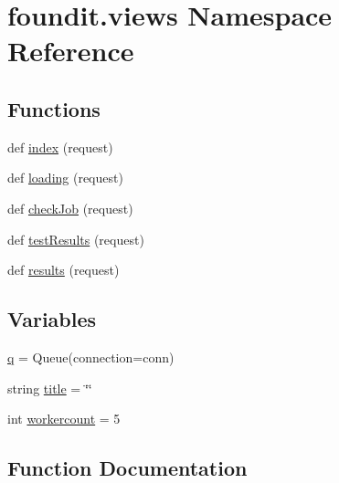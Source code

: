 \hypertarget{namespacefoundit_1_1views}{}\section{foundit.\+views Namespace Reference}
\label{namespacefoundit_1_1views}
\subsection*{Functions}
\begin{DoxyCompactItemize}
\item 
def \hyperlink{namespacefoundit_1_1views_a7dd28e8760cb6ba397d734043c840841}{index} (request)
\item 
def \hyperlink{namespacefoundit_1_1views_a1cea187af3aaa9ac41218cd985a3f24b}{loading} (request)
\item 
def \hyperlink{namespacefoundit_1_1views_a91bc63c48fad0582cbcff41458970486}{check\+Job} (request)
\item 
def \hyperlink{namespacefoundit_1_1views_a07ba7672a02678833190150670718cae}{test\+Results} (request)
\item 
def \hyperlink{namespacefoundit_1_1views_aaacc45f037dbadfc5ecd92f0a1ffa4e6}{results} (request)
\end{DoxyCompactItemize}
\subsection*{Variables}
\begin{DoxyCompactItemize}
\item 
\hyperlink{namespacefoundit_1_1views_a933f4b14aa78ea94e74f8f93970e4b12}{q} = Queue(connection=conn)
\item 
string \hyperlink{namespacefoundit_1_1views_a326af97fa9bba95a26dcbb7c1a1f0f04}{title} = \char`\"{}\char`\"{}
\item 
int \hyperlink{namespacefoundit_1_1views_adcdd2d7a86d9c9a1d91112a22adab904}{workercount} = 5
\end{DoxyCompactItemize}


\subsection{Function Documentation}
